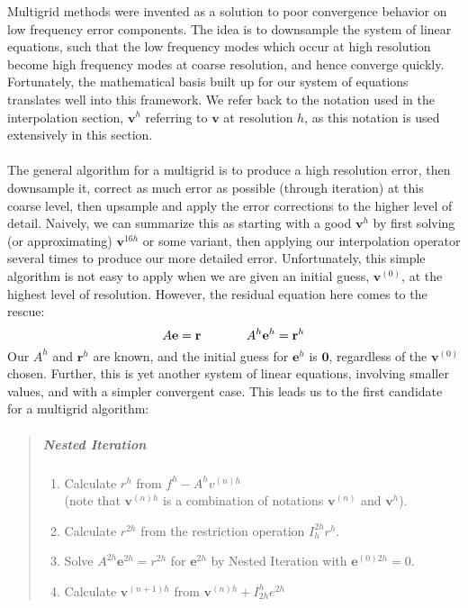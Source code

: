 Multigrid methods were invented as a solution to poor convergence behavior on low frequency error components. The idea is to downsample the system of linear equations, such that the low frequency modes which occur at high resolution become high frequency modes at coarse resolution, and hence converge quickly. Fortunately, the mathematical basis built up for our system of equations translates well into this framework. We refer back to the notation used in the interpolation section, $\textbf{v}^h$ referring to $\textbf{v}$ at resolution $h$, as this notation is used extensively in this section.
\\\\
The general algorithm for a multigrid is to produce a high resolution error, then downsample it, correct as much error as possible (through iteration) at this coarse level, then upsample and apply the error corrections to the higher level of detail. Naively, we can summarize this as starting with a good $\textbf{v}^h$ by first solving (or approximating) $\textbf{v}^{16h}$ or some variant, then applying our interpolation operator several times to produce our more detailed error. Unfortunately, this simple algorithm is not easy to apply when we are given an initial guess, $\textbf{v}^{(0)}$, at the highest level of resolution. However, the residual equation here comes to the rescue:
\[A\textbf{e}=\textbf{r}\hspace{.5in} A^{h}\textbf{e}^{h}=\textbf{r}^{h}\]
Our $A^{h}$ and $\textbf{r}^{h}$ are known, and the initial guess for $\textbf{e}^{h}$ is $\textbf{0}$, regardless of the $\textbf{v}^{(0)}$ chosen. Further, this is yet another system of linear equations, involving smaller values, and with a simpler convergent case. This leads us to the first candidate for a multigrid algorithm:
\vspace{-.2in}
\begin{quote}
\item
\subparagraph{Nested Iteration \cite{lee14}}
\begin{enumerate}
\item Calculate $r^h$ from $f^h-A^h{v}^{(n)h}$\\
(note that $\textbf{v}^{(n)h}$ is a combination of notations $\textbf{v}^{(n)}$ and $\textbf{v}^h$).
\item Calculate $r^{2h}$ from the restriction operation $I_{h}^{2h}r^h$.
\item Solve $A^{2h}\textbf{e}^{2h}=r^{2h}$ for $\textbf{e}^{2h}$ by Nested Iteration with $\textbf{e}^{(0)2h}=0$.
\item Calculate $\textbf{v}^{(n+1)h}$ from
	$\textbf{v}^{(n)h}+I_{2h}^he^{2h}$
\end{enumerate}
\end{quote}
